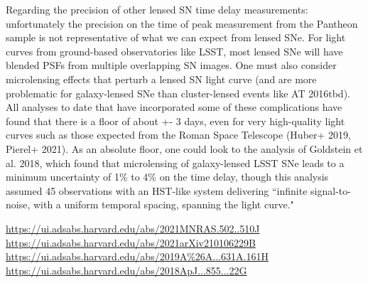 \documentclass[11pt]{article}
\begin{document}
{Regarding the precision of other lensed SN time delay measurements:  unfortunately the precision on the time of peak measurement from the Pantheon sample is not representative of what we can expect from lensed SNe.   For light curves from ground-based observatories like LSST, most lensed SNe will have blended PSFs from multiple overlapping SN images.  One must also consider microlensing effects that perturb a lensed SN light curve (and are more problematic for galaxy-lensed SNe than cluster-lensed events like AT 2016tbd).    All analyses to date that have incorporated some of these complications have found that there is a floor of about +- 3 days, even for very high-quality light curves such as those expected from the Roman Space Telescope (Huber+ 2019, Pierel+ 2021).    As an absolute floor, one could look to the analysis of Goldstein et al. 2018, which found that microlensing of galaxy-lensed LSST SNe leads to a minimum uncertainty of 1\% to 4\% on the time delay, though this analysis assumed 45 observations with an HST-like system delivering  ``infinite signal-to-noise, with a uniform temporal spacing, spanning the light curve."

\noindent\url{https://ui.adsabs.harvard.edu/abs/2021MNRAS.502..510J}\\
\url{https://ui.adsabs.harvard.edu/abs/2021arXiv210106229B}\\
\url{https://ui.adsabs.harvard.edu/abs/2019A\%26A...631A.161H}\\
\url{https://ui.adsabs.harvard.edu/abs/2018ApJ...855...22G}
}


\end{document}

